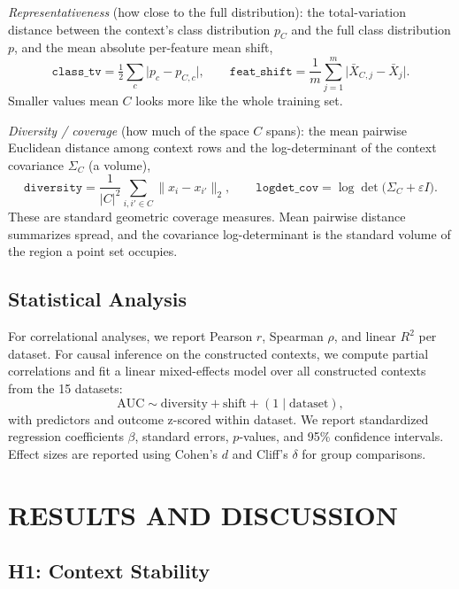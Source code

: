 \documentclass{article}
\begin{document}
\emph{Representativeness} (how close to the full distribution): the total-variation distance between the context's class distribution $p_C$ and the full class distribution $p$, and the mean absolute per-feature mean shift,
\begin{equation}
\texttt{class\_tv} = \tfrac{1}{2}\sum_{c} \lvert p_c - p_{C,c}\rvert, \qquad
\texttt{feat\_shift} = \frac{1}{m}\sum_{j=1}^{m} \bigl\lvert \bar{X}_{C,j} - \bar{X}_{j}\bigr\rvert.
\end{equation}
Smaller values mean $C$ looks more like the whole training set.

\emph{Diversity / coverage} (how much of the space $C$ spans): the mean pairwise Euclidean distance among context rows and the log-determinant of the context covariance $\Sigma_C$ (a volume),
\begin{equation}
\texttt{diversity} = \frac{1}{\lvert C\rvert^2}\sum_{i,i'\in C} \lVert x_i - x_{i'}\rVert_2, \qquad
\texttt{logdet\_cov} = \log\det\!\bigl(\Sigma_C + \varepsilon I\bigr).
\end{equation}
These are standard geometric coverage measures. Mean pairwise distance summarizes spread, and the covariance log-determinant is the standard volume of the region a point set occupies.

\subsection{Statistical Analysis}

For correlational analyses, we report Pearson $r$, Spearman $\rho$, and linear $R^2$ per dataset. For causal inference on the constructed contexts, we compute partial correlations and fit a linear mixed-effects model over all constructed contexts from the 15 datasets:
\[
\text{AUC} \sim \text{diversity} + \text{shift} + (1\mid\text{dataset}),
\]
with predictors and outcome z-scored within dataset. We report standardized regression coefficients $\beta$, standard errors, $p$-values, and 95\% confidence intervals. Effect sizes are reported using Cohen's $d$ and Cliff's $\delta$ for group comparisons.

\section{RESULTS AND DISCUSSION}

\subsection{H1: Context Stability}
\end{document}
